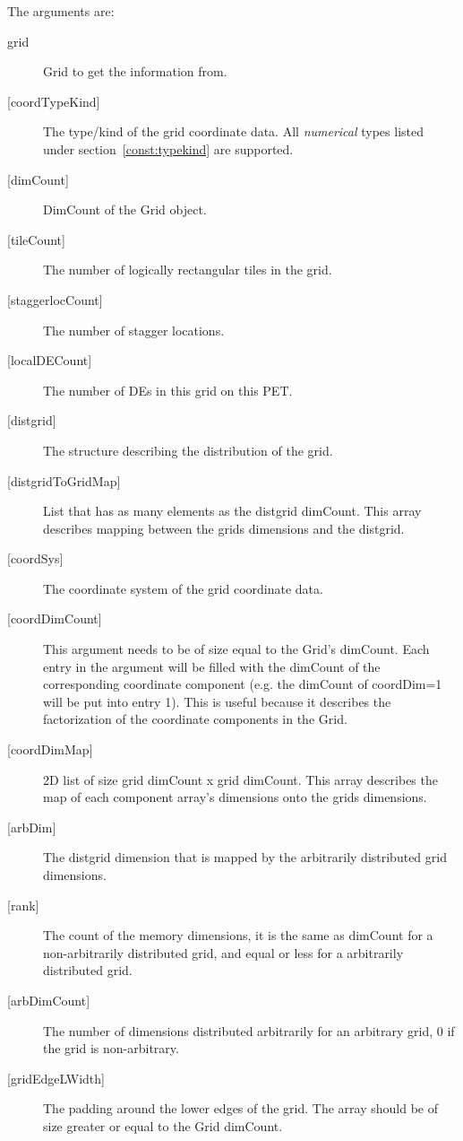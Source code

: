   The arguments are:
  \begin{description}
  \item[grid]
     Grid to get the information from.
  \item[{[coordTypeKind]}]
     The type/kind of the grid coordinate data. All {\em numerical} types
     listed under section~\ref{const:typekind} are supported.
  \item[{[dimCount]}]
     DimCount of the Grid object.
  \item[{[tileCount]}]
     The number of logically rectangular tiles in the grid.
  \item[{[staggerlocCount]}]
     The number of stagger locations.
  \item[{[localDECount]}]
     The number of DEs in this grid on this PET.
  \item[{[distgrid]}]
     The structure describing the distribution of the grid.
  \item[{[distgridToGridMap]}]
     List that has as many elements as the distgrid dimCount. This array describes
     mapping between the grids dimensions and the distgrid.
   \item[{[coordSys]}]
       The coordinate system of the grid coordinate data.
   \item[{[coordDimCount]}]
     This argument needs to be of size equal to the Grid's dimCount.
     Each entry in the argument will be filled with the dimCount of the corresponding coordinate component (e.g. the
     dimCount of coordDim=1 will be put into entry 1).
     This is useful because it describes the factorization of the coordinate components in the Grid.
  \item[{[coordDimMap]}]
     2D list of size grid dimCount x grid dimCount. This array describes the
     map of each component array's dimensions onto the grids
     dimensions.
   \item[{[arbDim]}]
     The distgrid dimension that is mapped by the arbitrarily distributed grid dimensions.
   \item[{[rank]}]
     The count of the memory dimensions, it is the same as dimCount for a non-arbitrarily distributed grid,
     and equal or less for a arbitrarily distributed grid.
   \item[{[arbDimCount]}]
     The number of dimensions distributed arbitrarily for an arbitrary grid, 0 if the grid is non-arbitrary.
   \item[{[gridEdgeLWidth]}]
     The padding around the lower edges of the grid. The array should
     be of size greater or equal to the Grid dimCount.

\end{description}
